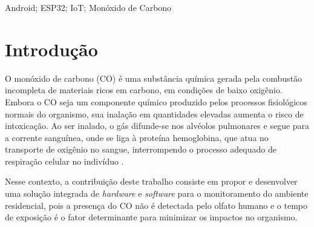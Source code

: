 \documentclass[alpha-refs,brazilian]{RBCA_v3.0}
\begin{document}
\begin{frontmatter}
\begin{palavras_chave} %
	Android; ESP32; IoT; Monóxido de Carbono
\end{palavras_chave}

\end{frontmatter}

\section{Introdução}

O monóxido de carbono (CO) é uma substância química gerada pela combustão incompleta de materiais ricos em carbono, em condições de baixo oxigênio. 
Embora o CO seja um componente químico produzido pelos processos fisiológicos normais do organismo, sua inalação em quantidades elevadas aumenta o 
risco de intoxicação. Ao ser inalado, o gás difunde-se nos alvéolos pulmonares e segue para a corrente sanguínea, onde se liga à proteína hemoglobina, 
que atua no transporte de oxigênio no sangue, interrompendo o processo adequado de respiração celular no indivíduo \citep{gases-sufocantes-hernandez-2022}.

Nesse contexto, a contribuição deste trabalho consiste em propor e desenvolver uma solução integrada de 
\textit{hardware} e \textit{software} para o monitoramento do ambiente residencial, pois a presença do CO não 
é detectada pelo olfato humano e o tempo de exposição é o fator determinante para minimizar os impactos no organismo.

 
\end{document}
